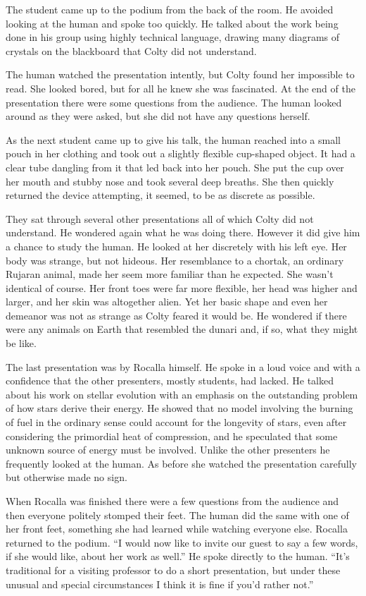 The student came up to the podium from the back of the room. He avoided looking at the human and
spoke too quickly. He talked about the work being done in his group using highly technical
language, drawing many diagrams of crystals on the blackboard that Colty did not understand.

The human watched the presentation intently, but Colty found her impossible to read. She looked
bored, but for all he knew she was fascinated. At the end of the presentation there were some
questions from the audience. The human looked around as they were asked, but she did not have
any questions herself.

As the next student came up to give his talk, the human reached into a small pouch in her
clothing and took out a slightly flexible cup-shaped object. It had a clear tube dangling from
it that led back into her pouch. She put the cup over her mouth and stubby nose and took several
deep breaths. She then quickly returned the device attempting, it seemed, to be as discrete as
possible.

They sat through several other presentations all of which Colty did not understand. He wondered
again what he was doing there. However it did give him a chance to study the human. He looked at
her discretely with his left eye. Her body was strange, but not hideous. Her resemblance to a
chortak, an ordinary Rujaran animal, made her seem more familiar than he expected. She wasn't
identical of course. Her front toes were far more flexible, her head was higher and larger, and
her skin was altogether alien. Yet her basic shape and even her demeanor was not as strange as
Colty feared it would be. He wondered if there were any animals on Earth that resembled the
dunari and, if so, what they might be like.

The last presentation was by Rocalla himself. He spoke in a loud voice and with a confidence
that the other presenters, mostly students, had lacked. He talked about his work on stellar
evolution with an emphasis on the outstanding problem of how stars derive their energy. He
showed that no model involving the burning of fuel in the ordinary sense could account for the
longevity of stars, even after considering the primordial heat of compression, and he speculated
that some unknown source of energy must be involved. Unlike the other presenters he frequently
looked at the human. As before she watched the presentation carefully but otherwise made no
sign.

When Rocalla was finished there were a few questions from the audience and then everyone
politely stomped their feet. The human did the same with one of her front feet, something she
had learned while watching everyone else. Rocalla returned to the podium. ``I would now like to
invite our guest to say a few words, if she would like, about her work as well.'' He spoke
directly to the human. ``It's traditional for a visiting professor to do a short presentation,
but under these unusual and special circumstances I think it is fine if you'd rather not.''

